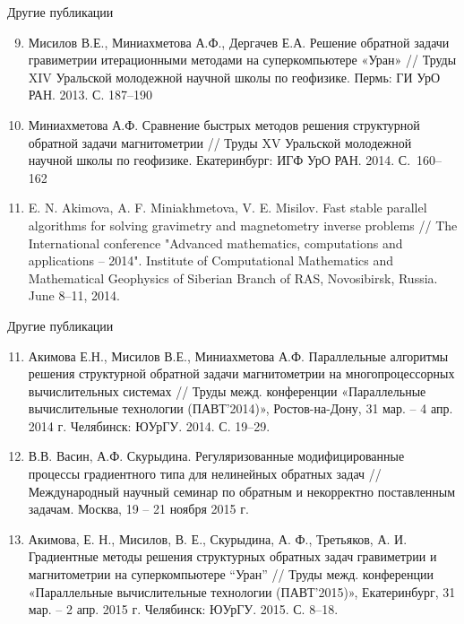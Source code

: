 \documentclass[10pt,pdf, mathserif, hyperref={unicode}]{beamer}
\begin{document}
\begin{frame}{Другие публикации}
	\begin{enumerate}
		\setcounter{enumi}{8}
			\item Мисилов В.Е., Миниахметова А.Ф., Дергачев Е.А. Решение обратной задачи гравиметрии итерационными методами на суперкомпьютере «Уран» // Труды XIV Уральской молодежной научной школы по геофизике. Пермь:
			ГИ УрО РАН.  2013. С. 187–190
			\item Миниахметова А.Ф. Сравнение быстрых методов решения структурной обратной задачи магнитометрии // Труды XV Уральской молодежной научной школы по геофизике. Екатеринбург: ИГФ УрО РАН. 2014. С.~160–162
			\item E. N. Akimova, A. F. Miniakhmetova, V. E. Misilov. Fast stable parallel algorithms for solving gravimetry and magnetometry inverse problems // The International conference "Advanced mathematics, computations and applications – 2014". Institute of Computational Mathematics and Mathematical Geophysics of Siberian Branch of RAS, Novosibirsk, Russia. June 8–11, 2014.
	\end{enumerate}
\end{frame}
\begin{frame}{Другие публикации}
	\begin{enumerate}
		\setcounter{enumi}{10}
		\item Акимова Е.Н., Мисилов В.Е., Миниахметова А.Ф. Параллельные алгоритмы решения структурной обратной задачи магнитометрии на многопроцессорных вычислительных системах  // Труды межд. конференции «Параллельные вычислительные технологии (ПАВТ’2014)», Ростов-на-Дону, 31 мар. – 4 апр. 2014 г. Челябинск:  ЮУрГУ. 2014. С. 19–29.
		\item В.В. Васин, А.Ф. Скурыдина. Регуляризованные модифицированные процессы градиентного типа для нелинейных обратных задач // Международный научный семинар по обратным и некорректно поставленным задачам. Москва, 19 – 21 ноября 2015 г.
		\item Акимова, Е. Н., Мисилов, В. Е., Скурыдина, А. Ф., Третьяков, А. И. Градиентные методы решения структурных обратных задач гравиметрии и магнитометрии на суперкомпьютере “Уран” // Труды межд. конференции «Параллельные вычислительные технологии (ПАВТ’2015)», Екатеринбург, 31 мар. – 2 апр. 2015 г. Челябинск: ЮУрГУ.  2015. С. 8–18.
	\end{enumerate}
\end{frame}
\end{document}
